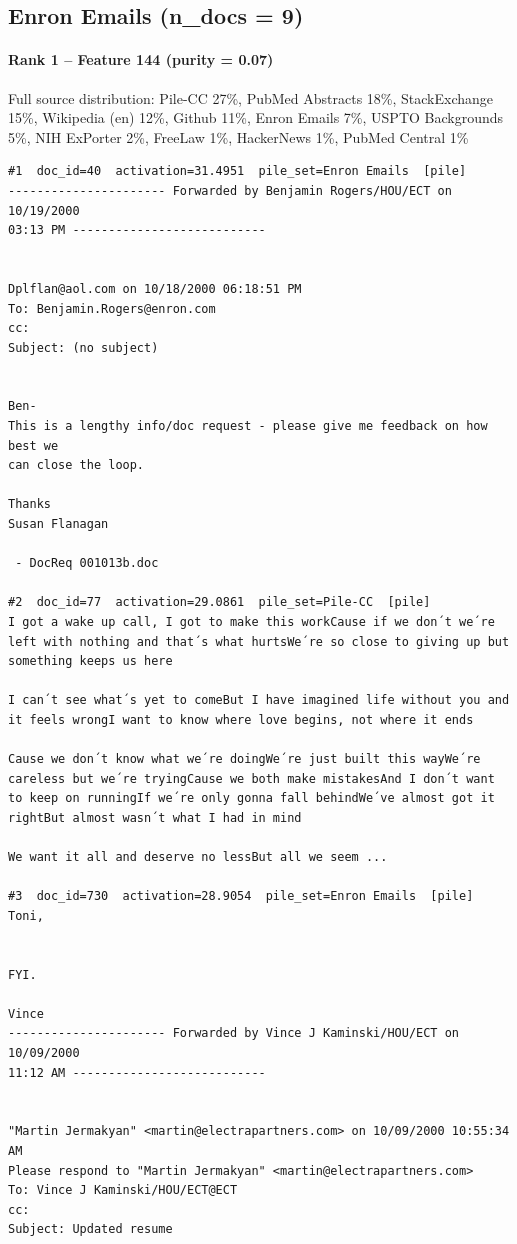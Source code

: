 \subsection*{Enron Emails (n\_docs = 9)}

\paragraph*{Rank 1 -- Feature 144 (purity = 0.07)}

Full source distribution: Pile-CC 27\%, PubMed Abstracts 18\%, StackExchange 15\%, Wikipedia (en) 12\%, Github 11\%, Enron Emails 7\%, USPTO Backgrounds 5\%, NIH ExPorter 2\%, FreeLaw 1\%, HackerNews 1\%, PubMed Central 1\%

\begin{verbatim}
#1  doc_id=40  activation=31.4951  pile_set=Enron Emails  [pile]
---------------------- Forwarded by Benjamin Rogers/HOU/ECT on 10/19/2000 
03:13 PM ---------------------------


Dplflan@aol.com on 10/18/2000 06:18:51 PM
To: Benjamin.Rogers@enron.com
cc:  
Subject: (no subject)


Ben-
This is a lengthy info/doc request - please give me feedback on how best we
can close the loop.

Thanks
Susan Flanagan

 - DocReq 001013b.doc

#2  doc_id=77  activation=29.0861  pile_set=Pile-CC  [pile]
I got a wake up call, I got to make this workCause if we don´t we´re left with nothing and that´s what hurtsWe´re so close to giving up but something keeps us here

I can´t see what´s yet to comeBut I have imagined life without you and it feels wrongI want to know where love begins, not where it ends

Cause we don´t know what we´re doingWe´re just built this wayWe´re careless but we´re tryingCause we both make mistakesAnd I don´t want to keep on runningIf we´re only gonna fall behindWe´ve almost got it rightBut almost wasn´t what I had in mind

We want it all and deserve no lessBut all we seem ...

#3  doc_id=730  activation=28.9054  pile_set=Enron Emails  [pile]
Toni,


FYI.

Vince
---------------------- Forwarded by Vince J Kaminski/HOU/ECT on 10/09/2000 
11:12 AM ---------------------------


"Martin Jermakyan" <martin@electrapartners.com> on 10/09/2000 10:55:34 AM
Please respond to "Martin Jermakyan" <martin@electrapartners.com>
To: Vince J Kaminski/HOU/ECT@ECT
cc:  
Subject: Updated resume




\end{verbatim}
